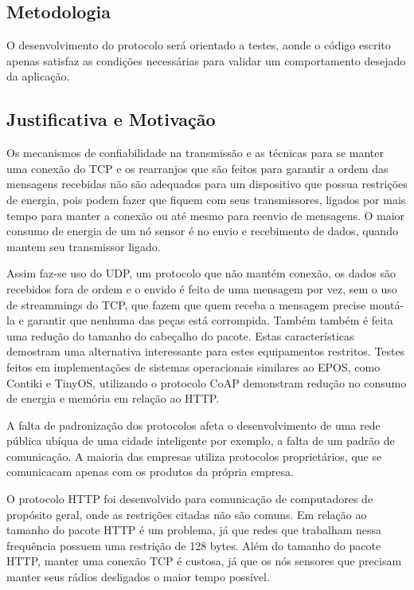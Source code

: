 \subsection{Metodologia}

O desenvolvimento do protocolo será orientado a testes, aonde o código escrito apenas satisfaz as condições necessárias para validar um comportamento desejado da aplicação.

\subsection{Justificativa e Motivação}

Os mecanismos de confiabilidade na transmissão e as técnicas para se manter uma conexão do TCP e os rearranjos que são feitos para garantir a ordem das mensagens recebidas não são adequados para um dispositivo que possua restrições de energia, pois podem fazer que fiquem com seus transmissores, ligados por mais tempo para manter a conexão ou até mesmo para reenvio de mensagens. O maior consumo de energia de um nó sensor é no envio e recebimento de dados, quando mantem seu transmissor ligado.

Assim faz-se uso do UDP, um protocolo que não mantém conexão, os dados são recebidos fora de ordem e o envido é feito de uma mensagem por vez, sem o uso de streammings do TCP, que fazem que quem receba a mensagem precise montá-la e garantir que nenhuma das peças está corrompida. Também também é feita uma redução do tamanho do cabeçalho do pacote. Estas características demostram uma alternativa interessante para estes equipamentos restritos. Testes feitos em implementações de sistemas operacionais similares ao EPOS, como Contiki e TinyOS, utilizando o protocolo CoAP demonstram redução no consumo de energia e memória em relação ao HTTP.

A falta de padronização dos protocolos afeta o desenvolvimento de uma rede pública ubíqua de uma cidade inteligente por exemplo, a falta de um padrão de comunicação. A maioria das empresas utiliza protocolos proprietários, que se comunicacam apenas com os produtos da própria empresa.

O protocolo HTTP foi desenvolvido para comunicação de computadores de propósito geral, onde as restrições citadas não são comuns. Em relação ao tamanho do pacote HTTP é um problema, já que redes que trabalham nessa frequência possuem uma restrição de 128 bytes.  Além do tamanho do pacote HTTP, manter uma conexão TCP é custosa, já que os nós sensores que precisam manter seus rádios desligados o maior tempo possível.

